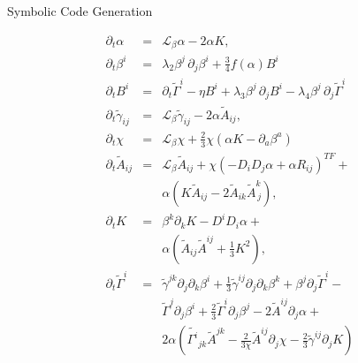 \documentclass[16pt,xcolor=table]{beamer}
\begin{document}
\begin{frame}[fragile]{Symbolic Code Generation}
\vspace{-0.5in}
	\begin{figure}
	\begin{minipage}[t]{.48\textwidth}
		\footnotesize
		\begin{eqnarray*}
			\partial_t \alpha &=&  \mathcal{L}_\beta\alpha - 2 \alpha K, \\
			\partial_t \beta^i &=& \lambda_2 \beta^j\,\partial_j\beta^i + \frac{3}{4} f(\alpha) B^i\\
			\partial_t B^i  &=& \partial_t \tilde\Gamma^i  - \eta B^{i}   + \lambda_3 \beta^j\,\partial_j B^i - \lambda_4 \beta^j\,\partial_j \tilde\Gamma^i \\
			\partial_t \tilde \gamma_{ij} &=&  \mathcal{L}_\beta\tilde{\gamma}_{ij} -2 \alpha \tilde A_{ij}, \\
			\partial_t \chi &=& \mathcal{L}_\beta\chi + \frac{2}{3}\chi \left(\alpha K -  
			\partial_a \beta^a\right)\\
			\partial_t \tilde A_{ij} &=& \mathcal{L}_\beta\tilde{A}_{ij} + \chi \left(-D_i D_j \alpha +
			\alpha R_{ij}\right)^{TF} +\nonumber \\
			&\,&\alpha \left(K \tilde A_{ij} -
			2 \tilde A_{ik} \tilde A^{k}_{\,j}\right), \label{eq:at_evol}\\
			\partial_t K &=& \beta^k\partial_kK- D^i D_i \alpha + \\
			&\,&\alpha \left(\tilde A_{ij}\tilde
			A^{ij} +\frac{1}{3}K^2\right),\\
			\partial_t \tilde \Gamma^i &=& \tilde \gamma^{jk} \partial_j
			\partial_k \beta^i + \frac{1}{3} \tilde \gamma^{ij} \partial_j
			\partial_k \beta^k + \beta^j \partial_j \tilde \Gamma^i - \nonumber \\
			&\,&\tilde
			\Gamma^j \partial_j \beta^i + 
			\frac{2}{3}\tilde \Gamma^i \partial_j
			\beta^j - 2 \tilde A^{i j}\partial_j \alpha + \nonumber \\
			&\,& 2 \alpha \left(\tilde
			{\Gamma^i}_{jk} \tilde A^{jk} - \frac{2}{3 \chi} \tilde A^{ij}\partial_j \chi -
			\frac{2}{3} \tilde \gamma^{ij} \partial_j K\right) \\
		\end{eqnarray*}
	\end{minipage}\hfill%
	\begin{minipage}[t]{.52\textwidth}
		\footnotesize
		\begin{verbatim}
			

\end{verbatim}
\end{minipage}
\end{figure}
\end{frame}
\end{document}
